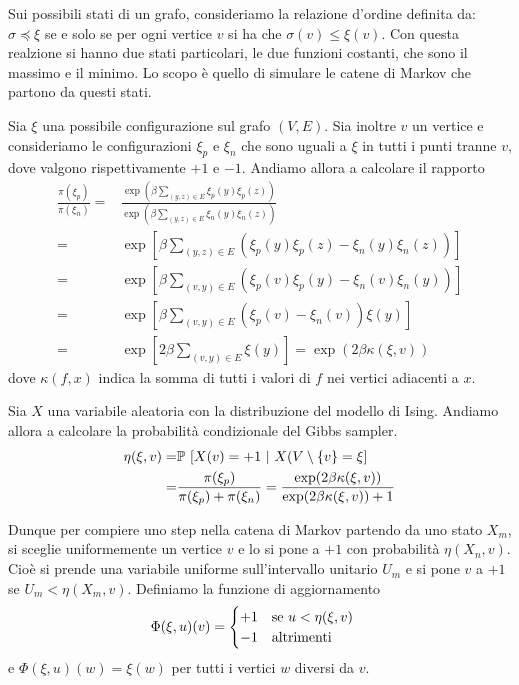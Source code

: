 \documentclass[]{marticle}
\begin{document}
Sui possibili stati di un grafo, consideriamo la relazione d'ordine definita da:
$\sigma \preceq \xi$ se e solo se per ogni vertice $v$ si ha che $\sigma(v) \leq
\xi(v)$.  Con questa realzione si hanno due stati particolari, le due funzioni
costanti, che sono il massimo e il minimo. Lo scopo \`e quello di simulare le
catene di Markov che partono da questi stati. 

Sia $\xi$ una possibile configurazione sul grafo $(V,E)$. Sia inoltre $v$ un
vertice e consideriamo le configurazioni $\xi_p$ e $\xi_n$ che sono uguali a
$\xi$ in tutti i punti tranne $v$, dove valgono rispettivamente $+1$ e $-1$.
Andiamo allora a calcolare il rapporto
\begin{align*}
    \frac{\pi(\xi_p)}{\pi(\xi_n)} =& 
    \frac{\exp (\beta \sum_{(y,z)\in E} \xi_p(y)\xi_p(z))} {\exp
            (\beta\sum_{(y,z)\in E} \xi_n(y)\xi_n(z))} \\
    =& \exp \left[\beta\sum_{(y,z)\in E}
        \left(\xi_p(y)\xi_p(z)-\xi_n(y)\xi_n(z)\right)\right ]\\
    =& \exp \left[\beta\sum_{(v,y)\in E}
        \left(\xi_p(v)\xi_p(y)-\xi_n(v)\xi_n(y)\right)\right ]\\
    =& \exp \left[\beta\sum_{(v,y)\in E}
        \left(\xi_p(v)-\xi_n(v)\right)\xi(y)\right ]\\
    =& \exp \left[2\beta\sum_{(v,y)\in E} \xi(y)\right ]
    = \exp \left(2\beta\kappa(\xi,v)\right)
\end{align*}
dove $\kappa(f,x)$ indica la somma di tutti i valori di $f$ nei vertici
adiacenti a $x$.

Sia $X$ una variabile aleatoria con la distribuzione del modello di Ising.
Andiamo allora a calcolare la probabilit\`a condizionale del Gibbs sampler.
\begin{align*}
    \eta(\xi,v) =&
    \mathbb{P}\ [X(v)=+1\ |\ X(V\setminus \{v\}=\xi]\\
    =& \frac{\pi(\xi_p)}{\pi(\xi_p)+\pi(\xi_n)}
    = \frac{\exp(2\beta\kappa(\xi,v))}{\exp(2\beta\kappa(\xi,v))+1}
\end{align*}

Dunque per compiere uno step nella catena di Markov partendo da uno stato $X_m$,
si sceglie uniformemente un vertice $v$ e lo si pone a $+1$ con probabilit\`a
$\eta(X_n, v)$. Cio\`e si prende una variabile uniforme sull'intervallo unitario
$U_m$ e si pone $v$ a $+1$ se $U_m<\eta(X_m,v)$. Definiamo la funzione di
aggiornamento
\[
    \Phi(\xi, u)(v) = 
    \begin{cases}
        +1 \text{\quad se $u < \eta(\xi,v)$}\\
        -1 \text{\quad altrimenti}
    \end{cases}
\]
e $\Phi(\xi,u)(w) = \xi(w)$ per tutti i vertici $w$ diversi da $v$.
\end{document}
